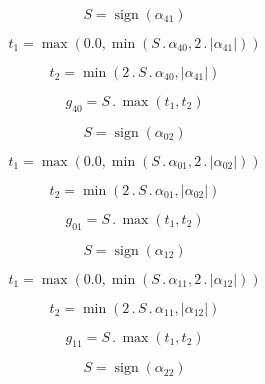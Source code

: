 \documentclass{article}
\begin{document}
\begin{dmath}S = \operatorname{sign}{\left (\alpha_{41} \right )}\end{dmath}

\begin{dmath}t_{1} = \max\left(0.0, \min\left(S \,.\, \alpha_{40}, 2 \,.\, \left|{\alpha_{41}}\right|\right)\right)\end{dmath}

\begin{dmath}t_{2} = \min\left(2 \,.\, S \,.\, \alpha_{40}, \left|{\alpha_{41}}\right|\right)\end{dmath}

\begin{dmath}g_{40} = S \,.\, \max\left(t_{1}, t_{2}\right)\end{dmath}

\begin{dmath}S = \operatorname{sign}{\left (\alpha_{02} \right )}\end{dmath}

\begin{dmath}t_{1} = \max\left(0.0, \min\left(S \,.\, \alpha_{01}, 2 \,.\, \left|{\alpha_{02}}\right|\right)\right)\end{dmath}

\begin{dmath}t_{2} = \min\left(2 \,.\, S \,.\, \alpha_{01}, \left|{\alpha_{02}}\right|\right)\end{dmath}

\begin{dmath}g_{01} = S \,.\, \max\left(t_{1}, t_{2}\right)\end{dmath}

\begin{dmath}S = \operatorname{sign}{\left (\alpha_{12} \right )}\end{dmath}

\begin{dmath}t_{1} = \max\left(0.0, \min\left(S \,.\, \alpha_{11}, 2 \,.\, \left|{\alpha_{12}}\right|\right)\right)\end{dmath}

\begin{dmath}t_{2} = \min\left(2 \,.\, S \,.\, \alpha_{11}, \left|{\alpha_{12}}\right|\right)\end{dmath}

\begin{dmath}g_{11} = S \,.\, \max\left(t_{1}, t_{2}\right)\end{dmath}

\begin{dmath}S = \operatorname{sign}{\left (\alpha_{22} \right )}\end{dmath}
\end{document}
